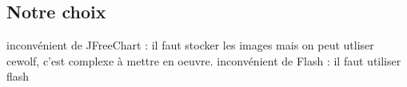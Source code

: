 \subsection{Notre choix}

inconvénient de JFreeChart : il faut stocker les images mais on peut utliser cewolf, c'est complexe à mettre en oeuvre.
inconvénient de Flash : il faut utiliser flash
